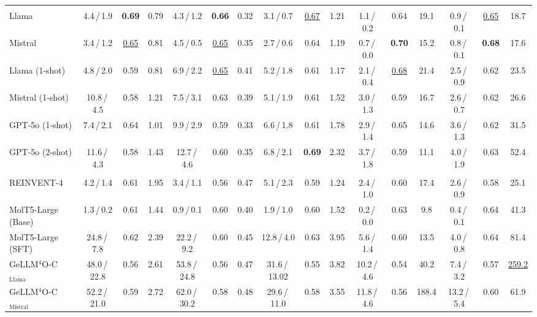 \documentclass[11pt]{article}
\begin{document}
\begin{table}[t]
{\begin{tabular}{@{}l ccc@{\hspace{4pt}} ccc@{\hspace{4pt}} ccc@{\hspace{4pt}} ccc@{\hspace{4pt}} ccc@{}}
\rowcolor{gray!15} \multicolumn{16}{c}{\textit{General Purpose LLMs (Zero- \& Few-Shot)}} \\
Llama        & 4.4\,/\,1.9 & \textbf{0.69} & 0.79 & 4.3\,/\,1.2 & \textbf{0.66} & 0.32 & 3.1\,/\,0.7 & \underline{0.67} & 1.21 & 1.1\,/\,0.2 & 0.64 & 19.1 & 0.9\,/\,0.1 & \underline{0.65} & 18.7 \\
Mistral      & 3.4\,/\,1.2 & \underline{0.65} & 0.81 & 4.5\,/\,0.5 & \underline{0.65} & 0.35 & 2.7\,/\,0.6 & 0.64 & 1.19 & 0.7\,/\,0.0 & \textbf{0.70} & 15.2 & 0.8\,/\,0.1 & \textbf{0.68} & 17.6 \\
Llama (1-shot) & 4.8\,/\,2.0 & 0.59 & 0.81 & 6.9\,/\,2.2 & \underline{0.65} & 0.41 & 5.2\,/\,1.8 & 0.61 & 1.17 & 2.1\,/\,0.4 & \underline{0.68} & 21.4 & 2.5\,/\,0.9 & 0.62 & 23.5 \\
Mistral (1-shot) & 10.8\,/\,4.5 & 0.58 & 1.21 & 7.5\,/\,3.1 & 0.63 & 0.39 & 5.1\,/\,1.9 & 0.61 & 1.52 & 3.0\,/\,1.3 & 0.59 & 16.7 & 2.6\,/\,0.7 & 0.62 & 26.6 \\
GPT-5o (1-shot) & 7.4\,/\,2.1 & 0.64 & 1.01 & 9.9\,/\,2.9 & 0.59 & 0.33 & 6.6\,/\,1.8 & 0.61 & 1.78 & 2.9\,/\,1.4 & 0.65 & 14.6 & 3.6\,/\,1.3 & 0.62 & 31.5 \\
GPT-5o (2-shot) & 11.6\,/\,4.3 & 0.58 & 1.43 & 12.7\,/\,4.6 & 0.60 & 0.35 & 6.8\,/\,2.1 & \textbf{0.69} & 2.32 & 3.7\,/\,1.8 & 0.59 & 11.1 & 4.0\,/\,1.9 & 0.63 & 52.4 \\

\rowcolor{gray!15} \multicolumn{16}{c}{\textit{Expert Models \& SFT Baselines}} \\
REINVENT-4 & 4.2\,/\,1.4 & 0.61 & 1.95 & 3.4\,/\,1.1 & 0.56 & 0.47 & 5.1\,/\,2.3 & 0.59 & 1.24 & 2.4\,/\,1.0 & 0.60 & 17.4 & 2.6\,/\,0.9 & 0.58 & 25.1 \\
MolT5-Large (Base) & 1.3\,/\,0.2 & 0.61 & 1.44 & 0.9\,/\,0.1 & 0.60 & 0.40 & 1.9\,/\,1.0 & 0.60 & 1.52 & 0.2\,/\,0.0 & 0.63 & 9.8 & 0.4\,/\,0.1 & 0.64 & 41.3 \\
MolT5-Large (SFT) & 24.8\,/\,7.8 & 0.62 & 2.39 & 22.2\,/\,9.2 & 0.60 & 0.45 & 12.8\,/\,4.0 & 0.63 & 3.95 & 5.6\,/\,1.4 & 0.60 & 13.5 & 4.0\,/\,0.8 & 0.64 & 81.4 \\
GeLLM$^4$O-C$_{\mathrm{Llama}}$ & 48.0\,/\,22.8 & 0.56 & 2.61  & 53.8\,/\,24.8 & 0.56 & 0.47  & 31.6\,/\,13.02 & 0.55 & 3.82  & 10.2\,/\,4.6 & 0.54 & 40.2  & 7.4\,/\,3.2 & 0.57 & \underline{259.2} \\
GeLLM$^4$O-C$_{\mathrm{Mistral}}$ & 52.2\,/\,21.0 & 0.59 & 2.72  & 62.0\,/\,30.2 & 0.58 & 0.48  & 29.6\,/\,11.0 & 0.58 & 3.55  & 11.8\,/\,4.6 & 0.56 & 188.4  & 13.2\,/\,5.4 & 0.60 & 61.9 \\


\end{tabular}}
\end{table}
\end{document}
